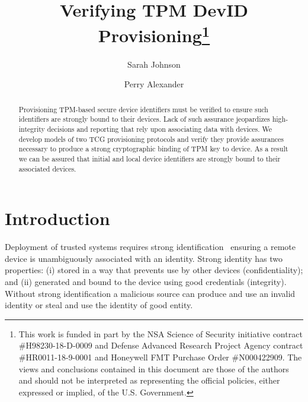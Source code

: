 \documentclass[runningheads]{llncs}
\begin{document}
%
\title{Verifying TPM DevID Provisioning\thanks{This work is funded in part
    by the NSA Science of Security initiative contract
    \#H98230-18-D-0009 and Defense Advanced Research Project Agency
    contract \#HR0011-18-9-0001 and Honeywell FMT Purchase Order
    \#N000422909. The views and conclusions contained in this document
    are those of the authors and should not be interpreted as
    representing the official policies, either expressed or implied,
    of the U.S. Government.}}
%
%
\author{Sarah Johnson \and
Perry Alexander}
%
%
%
\maketitle              %
%
\begin{abstract}
  Provisioning TPM-based secure device identifiers must be verified
  to ensure such identifiers are strongly bound to their devices.
  Lack of such assurance jeopardizes high-integrity decisions and
  reporting that rely upon associating data with devices.  We develop
  models of two TCG provisioning protocols and verify they provide
  assurances necessary to produce a strong cryptographic binding
  of TPM key to device.  As a result we can be assured that initial
  and local device identifiers are strongly bound to their associated
  devices.

\end{abstract}
%
%
%
\section{Introduction}

Deployment of trusted systems requires strong
identification~\citep{Martin:08:The-ten-page-in} ensuring a remote
device is unambiguously associated with an identity. Strong identity
has two properties: (i) stored in a way that prevents use by
other devices (confidentiality); and (ii) generated and bound to the device using good
credentials (integrity).  Without strong identification a
malicious source can produce and use an invalid identity or steal and
use the identity of good entity.
\end{document}
